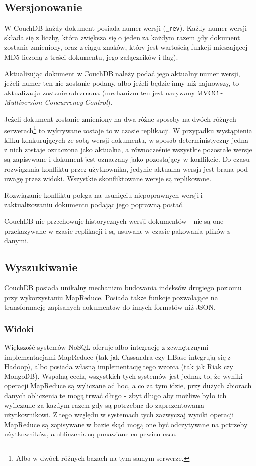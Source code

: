 \subsection*{Wersjonowanie}

W CouchDB każdy dokument posiada numer wersji (\verb+_rev+).
Każdy numer wersji składa się z liczby, która zwiększa się o jeden za każdym razem gdy dokument zostanie zmieniony, oraz z ciągu znaków, który jest wartością funkcji mieszającej MD5 liczoną z treści dokumentu, jego załączników i flag).

Aktualizując dokument w CouchDB należy podać jego aktualny numer wersji, jeżeli numer ten nie zostanie podany, albo jeżeli będzie inny niż najnowszy, to aktualizacja zostanie odrzucona (mechanizm ten jest nazywany MVCC - \emph{Multiversion Concurrency Control}).

Jeżeli dokument zostanie zmieniony na dwa różne sposoby na dwóch różnych serwerach\footnote{Albo w dwóch różnych bazach na tym samym serwerze.} to wykrywane zostaje to w czasie replikacji.
W przypadku wystąpienia kilku konkurujących ze sobą wersji dokumentu, w sposób deterministyczny jedna z nich zostaje oznaczona jako aktualna, a równocześnie wszystkie pozostałe wersje są zapisywane i dokument jest oznaczany jako pozostający w konflikcie.
Do czasu rozwiązania konfliktu przez użytkownika, jedynie aktualna wersja jest brana pod uwagę przez widoki.
Wszystkie skonfliktowane wersje są replikowane.

Rozwiązanie konfliktu polega na usunięciu niepoprawnych wersji i zaktualizowaniu dokumentu podając jego poprawną postać.

CouchDB nie przechowuje historycznych wersji dokumentów - nie są one przekazywane w czasie replikacji i są usuwane w czasie pakowania plików z danymi.

\subsection*{Wyszukiwanie}

CouchDB posiada unikalny mechanizm budowania indeksów drugiego poziomu przy wykorzystaniu MapReduce.
Posiada także funkcje pozwalające na transformację zapisanych dokumentów do innych formatów niż JSON.

\subsubsection*{Widoki}

Większość systemów NoSQL oferuje albo integrację z zewnętrznymi implementacjami MapReduce (tak jak Cassandra czy HBase integrują się z Hadoop), albo posiada własną implementację tego wzorca (tak jak Riak czy MongoDB).
Wspólną cechą wszystkich tych systemów jest jednak to, że wyniki operacji MapReduce są wyliczane ad hoc, a co za tym idzie, przy dużych zbiorach danych obliczenia te mogą trwać długo - zbyt długo aby możliwe było ich wyliczanie za każdym razem gdy są potrzebne do zaprezentowania użytkownikowi.
Z tego względu w systemach tych zazwyczaj wyniki operacji MapReduce są zapisywane w bazie skąd mogą one być odczytywane na potrzeby użytkowników, a obliczenia są ponawiane co pewien czas.

